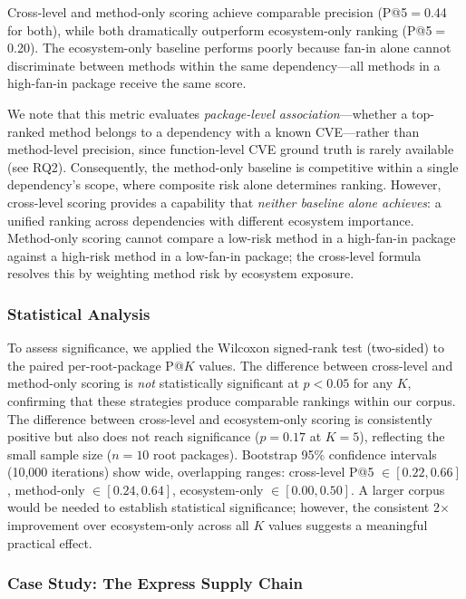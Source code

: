\documentclass[conference]{IEEEtran}
\begin{document}
Cross-level and method-only scoring achieve comparable precision (P@5$=$0.44 for both), while both dramatically outperform ecosystem-only ranking (P@5$=$0.20). The ecosystem-only baseline performs poorly because fan-in alone cannot discriminate between methods within the same dependency---all methods in a high-fan-in package receive the same score.

We note that this metric evaluates \emph{package-level association}---whether a top-ranked method belongs to a dependency with a known CVE---rather than method-level precision, since function-level CVE ground truth is rarely available (see RQ2). Consequently, the method-only baseline is competitive within a single dependency's scope, where composite risk alone determines ranking. However, cross-level scoring provides a capability that \emph{neither baseline alone achieves}: a unified ranking across dependencies with different ecosystem importance. Method-only scoring cannot compare a low-risk method in a high-fan-in package against a high-risk method in a low-fan-in package; the cross-level formula resolves this by weighting method risk by ecosystem exposure.

\subsubsection{Statistical Analysis}

To assess significance, we applied the Wilcoxon signed-rank test (two-sided) to the paired per-root-package P@$K$ values. The difference between cross-level and method-only scoring is \emph{not} statistically significant at $p < 0.05$ for any $K$, confirming that these strategies produce comparable rankings within our corpus. The difference between cross-level and ecosystem-only scoring is consistently positive but also does not reach significance ($p = 0.17$ at $K{=}5$), reflecting the small sample size ($n{=}10$ root packages). Bootstrap 95\% confidence intervals (10,000 iterations) show wide, overlapping ranges: cross-level P@5 $\in [0.22, 0.66]$, method-only $\in [0.24, 0.64]$, ecosystem-only $\in [0.00, 0.50]$. A larger corpus would be needed to establish statistical significance; however, the consistent 2$\times$ improvement over ecosystem-only across all $K$ values suggests a meaningful practical effect.

\subsubsection{Case Study: The Express Supply Chain}
\end{document}
